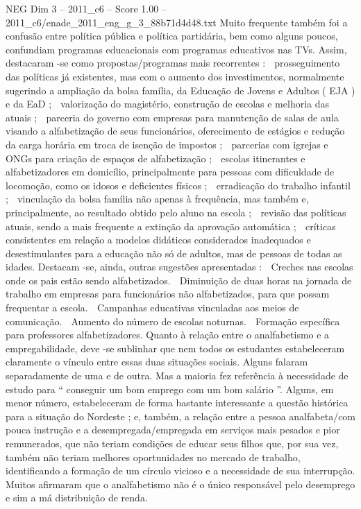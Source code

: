 \begin{textsample}{NEG Dim 3 – 2011\_c6 – Score 1.00 – 2011\_c6/enade\_2011\_eng\_g\_3\_88b71d4d48.txt}
Muito frequente também foi a confusão entre política pública e política partidária, bem como alguns poucos, confundiam programas educacionais com programas educativos nas TVs.
Assim, destacaram -se como propostas/programas mais recorrentes :  prosseguimento das políticas já existentes, mas com o aumento dos investimentos, normalmente sugerindo a ampliação da bolsa família, da Educação de Jovens e Adultos ( EJA ) e da EaD ;  valorização do magistério, construção de escolas e melhoria das atuais ;  parceria do governo com empresas para manutenção de salas de aula visando a alfabetização de seus funcionários, oferecimento de estágios e redução da carga horária em troca de isenção de impostos ;  parcerias com igrejas e ONGs para criação de espaços de alfabetização ;  escolas itinerantes e alfabetizadores em domicílio, principalmente para pessoas com dificuldade de locomoção, como os idosos e deficientes físicos ;  erradicação do trabalho infantil ;  vinculação da bolsa família não apenas à frequência, mas também e, principalmente, ao resultado obtido pelo aluno na escola ;  revisão das políticas atuais, sendo a mais frequente a extinção da aprovação automática ;  críticas consistentes em relação a modelos didáticos considerados inadequados e desestimulantes para a educação não só de adultos, mas de pessoas de todas as idades.
Destacam -se, ainda, outras sugestões apresentadas :  Creches nas escolas onde os pais estão sendo alfabetizados.  Diminuição de duas horas na jornada de trabalho em empresas para funcionários não alfabetizados, para que possam frequentar a escola.  Campanhas educativas vinculadas aos meios de comunicação.  Aumento do número de escolas noturnas.  Formação específica para professores alfabetizadores.
Quanto à relação entre o analfabetismo e a empregabilidade, deve -se sublinhar que nem todos os estudantes estabeleceram claramente o vínculo entre essas duas situações sociais.
Alguns falaram separadamente de uma e de outra.
Mas a maioria fez referência à necessidade de estudo para “ conseguir um bom emprego com um bom salário ”.
Alguns, em menor número, estabeleceram de forma bastante interessante a questão histórica para a situação do Nordeste ; e, também, a relação entre a pessoa analfabeta/com pouca instrução e a desempregada/empregada em serviços mais pesados e pior remunerados, que não teriam condições de educar seus filhos que, por sua vez, também não teriam melhores oportunidades no mercado de trabalho, identificando a formação de um círculo vicioso e a necessidade de sua interrupção.
Muitos afirmaram que o analfabetismo não é o único responsável pelo desemprego e sim a má distribuição de renda.

\end{textsample}
